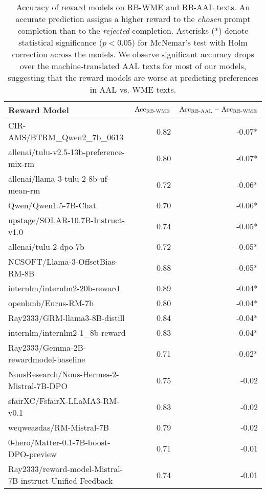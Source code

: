 \begin{table*}[t]
\begin{center}
\small
\begin{tabular}{lrr}
\toprule
Reward Model & $\text{Acc}_{\text{\textsc{RB-WME}}}$ & $\text{Acc}_{\text{\textsc{RB-AAL}}} - \text{Acc}_{\text{\textsc{RB-WME}}}$ \\
\midrule
CIR-AMS/BTRM\_Qwen2\_7b\_0613 & 0.82 & -0.07* \\
allenai/tulu-v2.5-13b-preference-mix-rm & 0.80 & -0.07* \\
allenai/llama-3-tulu-2-8b-uf-mean-rm & 0.72 & -0.06* \\
Qwen/Qwen1.5-7B-Chat & 0.70 & -0.06* \\
upstage/SOLAR-10.7B-Instruct-v1.0 & 0.74 & -0.05* \\
allenai/tulu-2-dpo-7b & 0.72 & -0.05* \\
NCSOFT/Llama-3-OffsetBias-RM-8B & 0.88 & -0.05* \\
internlm/internlm2-20b-reward & 0.89 & -0.04* \\
openbmb/Eurus-RM-7b & 0.80 & -0.04* \\
Ray2333/GRM-llama3-8B-distill & 0.84 & -0.04* \\
internlm/internlm2-1\_8b-reward & 0.83 & -0.04* \\
Ray2333/Gemma-2B-rewardmodel-baseline & 0.71 & -0.02* \\
NousResearch/Nous-Hermes-2-Mistral-7B-DPO & 0.75 & -0.02 \\
sfairXC/FsfairX-LLaMA3-RM-v0.1 & 0.83 & -0.02 \\
weqweasdas/RM-Mistral-7B & 0.79 & -0.02 \\
0-hero/Matter-0.1-7B-boost-DPO-preview & 0.71 & -0.01 \\
Ray2333/reward-model-Mistral-7B-instruct-Unified-Feedback & 0.74 & -0.01 \\
\bottomrule
\end{tabular}
\caption{Accuracy of reward models on \textsc{RB-WME} and \textsc{RB-AAL} texts. An accurate prediction assigns a higher reward to the \textit{chosen} prompt completion than to the \textit{rejected} completion. Asterisks (*) denote statistical significance ($p < 0.05$) for McNemar's test with Holm correction across the models. We observe significant accuracy drops over the machine-translated AAL texts for most of our models, suggesting that the reward models are worse at predicting preferences in AAL vs. WME texts.}
\label{tab:rb_acc_wprompt}
\normalsize
\end{center}
\end{table*}

